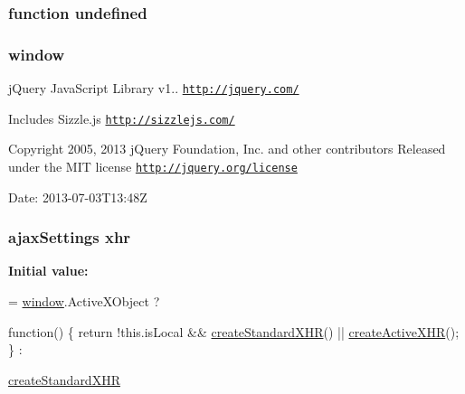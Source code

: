 \subsubsection[{undefined}]{\setlength{\rightskip}{0pt plus 5cm}function undefined}\label{_bibabook_2_scripts_2jquery-1_810_82_8js_a08113a236cc18d2a9d5ce27e638012be}
\hypertarget{_bibabook_2_scripts_2jquery-1_810_82_8js_a04a8a2bbfa9c15500892b8e5033d625b}{}
\subsubsection[{window}]{\setlength{\rightskip}{0pt plus 5cm}window}\label{_bibabook_2_scripts_2jquery-1_810_82_8js_a04a8a2bbfa9c15500892b8e5033d625b}
j\+Query Java\+Script Library v1.. \href{http://jquery.com/}{\tt http\+://jquery.\+com/}

Includes Sizzle.\+js \href{http://sizzlejs.com/}{\tt http\+://sizzlejs.\+com/}

Copyright 2005, 2013 j\+Query Foundation, Inc. and other contributors Released under the M\+I\+T license \href{http://jquery.org/license}{\tt http\+://jquery.\+org/license}

Date\+: 2013-\/07-\/03\+T13\+:48\+Z \hypertarget{_bibabook_2_scripts_2jquery-1_810_82_8js_a0b7a5cb538ca9913b1b3b1c807ad06f0}{}
\subsubsection[{xhr}]{ {\bf ajax\+Settings} xhr}\label{_bibabook_2_scripts_2jquery-1_810_82_8js_a0b7a5cb538ca9913b1b3b1c807ad06f0}
{\bfseries Initial value\+:}
\begin{DoxyCode}
= \hyperlink{_bibabook_2_scripts_2jquery-1_810_82_8js_a04a8a2bbfa9c15500892b8e5033d625b}{window}.ActiveXObject ?
    
    \textcolor{keyword}{function}() \{
        \textcolor{keywordflow}{return} !this.isLocal && \hyperlink{_bibabook_2_scripts_2jquery-1_810_82_8js_acea019a8b67e4d114deb75d1e0b3474a}{createStandardXHR}() || 
      \hyperlink{_bibabook_2_scripts_2jquery-1_810_82_8js_a54bf63f1b5f905292db45a1d6a9dc300}{createActiveXHR}();
    \} :
    
    \hyperlink{_bibabook_2_scripts_2jquery-1_810_82_8js_acea019a8b67e4d114deb75d1e0b3474a}{createStandardXHR}
\end{DoxyCode}
\hypertarget{_bibabook_2_scripts_2jquery-1_810_82_8js_a068f27a70831ff3a9e0ffa79e063847f}{}
